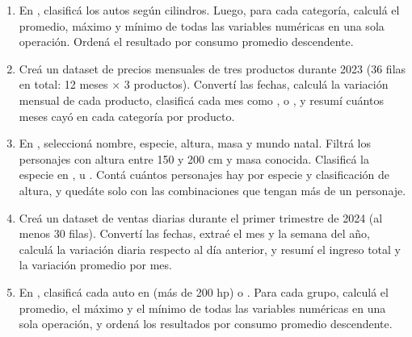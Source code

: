 \documentclass[8pt]{beamer}
\begin{document}
	\begin{frame}[fragile]
		\begin{enumerate}[start=30]
			\item En , clasificá los autos según cilindros. Luego, para cada categoría, calculá el promedio, máximo y mínimo de todas las variables numéricas en una sola operación. Ordená el resultado por consumo promedio descendente.

			\item Creá un dataset de precios mensuales de tres productos durante 2023 (36 filas en total: 12 meses × 3 productos). Convertí las fechas, calculá la variación mensual de cada producto, clasificá cada mes como ,  o , y resumí cuántos meses cayó en cada categoría por producto.

			\item En , seleccioná nombre, especie, altura, masa y mundo natal. Filtrá los personajes con altura entre 150 y 200 cm y masa conocida. Clasificá la especie en ,  u . Contá cuántos personajes hay por especie y clasificación de altura, y quedáte solo con las combinaciones que tengan más de un personaje.

			\item Creá un dataset de ventas diarias durante el primer trimestre de 2024 (al menos 30 filas). Convertí las fechas, extraé el mes y la semana del año, calculá la variación diaria respecto al día anterior, y resumí el ingreso total y la variación promedio por mes.

			\item En , clasificá cada auto en  (más de 200 hp) o . Para cada grupo, calculá el promedio, el máximo y el mínimo de todas las variables numéricas en una sola operación, y ordená los resultados por consumo promedio descendente.
		\end{enumerate}
	\end{frame}
\end{document}
